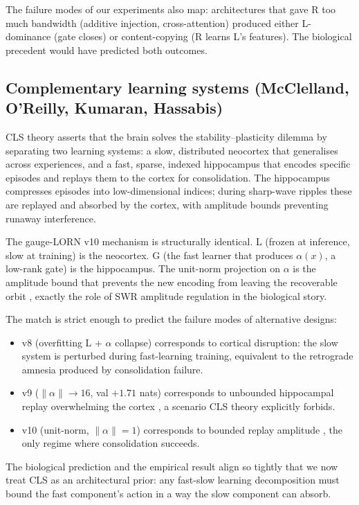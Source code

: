 \documentclass[11pt, a4paper]{article}
\begin{document}
The failure modes of our experiments also map: architectures that gave R too much bandwidth (additive injection, cross-attention) produced either L-dominance (gate closes) or content-copying (R learns L's features). The biological precedent would have predicted both outcomes.

\subsection{Complementary learning systems (McClelland, O'Reilly, Kumaran, Hassabis)}

CLS theory asserts that the brain solves the stability--plasticity dilemma by separating two learning systems: a slow, distributed neocortex that generalises across experiences, and a fast, sparse, indexed hippocampus that encodes specific episodes and replays them to the cortex for consolidation. The hippocampus compresses episodes into low-dimensional indices; during sharp-wave ripples these are replayed and absorbed by the cortex, with amplitude bounds preventing runaway interference.

The gauge-LORN v10 mechanism is structurally identical. L (frozen at inference, slow at training) is the neocortex. G (the fast learner that produces $\alpha(x)$, a low-rank gate) is the hippocampus. The unit-norm projection on $\alpha$ is the amplitude bound that prevents the new encoding from leaving the recoverable orbit ,  exactly the role of SWR amplitude regulation in the biological story.

The match is strict enough to predict the failure modes of alternative designs:
\begin{itemize}[nosep]
\item v8 (overfitting L + $\alpha$ collapse) corresponds to cortical disruption: the slow system is perturbed during fast-learning training, equivalent to the retrograde amnesia produced by consolidation failure.
\item v9 ($\|\alpha\| \to 16$, val $+1.71$ nats) corresponds to unbounded hippocampal replay overwhelming the cortex ,  a scenario CLS theory explicitly forbids.
\item v10 (unit-norm, $\|\alpha\| = 1$) corresponds to bounded replay amplitude ,  the only regime where consolidation succeeds.
\end{itemize}

The biological prediction and the empirical result align so tightly that we now treat CLS as an architectural prior: any fast-slow learning decomposition must bound the fast component's action in a way the slow component can absorb.
\end{document}
